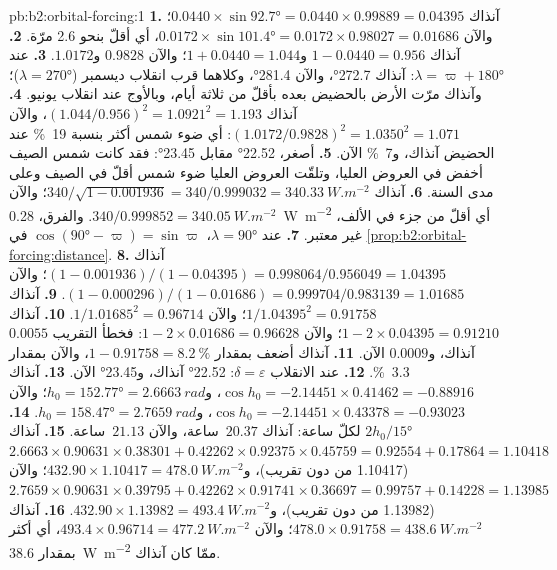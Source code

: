 \begin{solution}{pb:b2:orbital-forcing:1}
\textbf{1.} آنذاك $0.0440 \times \sin\ang{92.7} = 0.0440 \times 0.99889 = 0.04395$؛ والآن $0.0172 \times
\sin\ang{101.4} = 0.0172 \times 0.98027 = 0.01686$، أي أقلّ بنحو 2.6 مرّة.
\textbf{2.} آنذاك $1 - 0.0440 = 0.956$ و$1 + 0.0440 = 1.044$؛ والآن $0.9828$ و$1.0172$.
\textbf{3.} عند $\lambda = \varpi + \ang{180}$: آنذاك \ang{272.7}، والآن \ang{281.4}، وكلاهما قرب
انقلاب ديسمبر ($\lambda = \ang{270}$)؛ وآنذاك مرّت الأرض بالحضيض بعده بأقلّ من ثلاثة أيام،
وبالأوج عند انقلاب يونيو.
\textbf{4.} آنذاك $(1.044/0.956)^2 = 1.0921^2 = 1.193$، والآن $(1.0172/0.9828)^2 = 1.0350^2 = 1.071$:
أي ضوء شمس أكثر بنسبة \qty{19}{\percent} عند الحضيض آنذاك، و\qty{7}{\percent} الآن.
\textbf{5.} أصغر، \ang{22.52} مقابل \ang{23.45}: فقد كانت شمس الصيف أخفض في العروض العليا،
وتلقّت العروض العليا ضوء شمس أقلّ في الصيف وعلى مدى السنة.
\textbf{6.} آنذاك $340/\sqrt{1 - 0.001936} = 340/0.999032 = \qty{340.33}{W.m^{-2}}$؛ والآن $340/0.999852
= \qty{340.05}{W.m^{-2}}$. والفرق، \qty{0.28}{W.m^{-2}} أي أقلّ من جزء في الألف،
غير معتبر.
\textbf{7.} عند $\lambda = \ang{90}$، $\cos(\ang{90} - \varpi) = \sin\varpi$ في
\cref{prop:b2:orbital-forcing:distance}.
\textbf{8.} آنذاك $(1 - 0.001936)/(1 - 0.04395) = 0.998064/0.956049 = 1.04395$؛ والآن $(1 -
0.000296)/(1 - 0.01686) = 0.999704/0.983139 = 1.01685$.
\textbf{9.} آنذاك $1/1.04395^2 = 0.91758$؛ والآن $1/1.01685^2 = 0.96714$.
\textbf{10.} آنذاك $1 - 2 \times 0.04395 = 0.91210$؛ والآن $1 - 2 \times 0.01686 = 0.96628$: فخطأ
التقريب $0.0055$ آنذاك، و$0.0009$ الآن.
\textbf{11.} آنذاك أضعف بمقدار $1 - 0.91758 = \qty{8.2}{\percent}$، والآن بمقدار \qty{3.3}{\percent}.
\textbf{12.} عند الانقلاب $\delta = \varepsilon$: \ang{22.52} آنذاك، و\ang{23.45} الآن.
\textbf{13.} آنذاك $\cos h_0 = -2.14451 \times 0.41462 = -0.88916$، و$h_0 = \ang{152.77} =
\qty{2.6663}{rad}$؛ والآن $\cos h_0 = -2.14451 \times 0.43378 = -0.93023$، و$h_0 = \ang{158.47} =
\qty{2.7659}{rad}$.
\textbf{14.} $2h_0/\ang{15}$ لكلّ ساعة: آنذاك $20.37$~ساعة، والآن $21.13$~ساعة.
\textbf{15.} آنذاك $2.6663 \times 0.90631 \times 0.38301 + 0.42262 \times 0.92375 \times 0.45759 =
0.92554 + 0.17864 = 1.10418$ (\num{1.10417} من دون تقريب)، و$432.90 \times 1.10417 =
\qty{478.0}{W.m^{-2}}$؛ والآن $2.7659 \times 0.90631 \times 0.39795 + 0.42262 \times 0.91741 \times
0.36697 = 0.99757 + 0.14228 = 1.13985$ (\num{1.13982} من دون تقريب)، و$432.90 \times 1.13982 = \qty{493.4}{W.m^{-2}}$.
\textbf{16.} آنذاك $478.0 \times 0.91758 = \qty{438.6}{W.m^{-2}}$؛ والآن $493.4 \times 0.96714 =
\qty{477.2}{W.m^{-2}}$، أي أكثر بمقدار \qty{38.6}{W.m^{-2}} ممّا كان آنذاك.

\end{solution}
